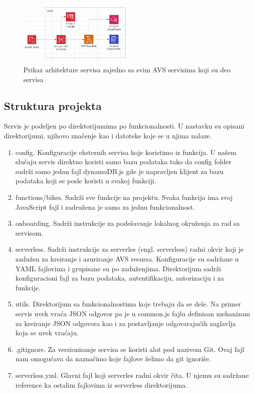 \documentclass[12pt,oneside]{memoir}
\begin{document}
\begin{figure}[!ht]
  \centering
  \includegraphics[width=0.5\textwidth]{AWS-Architecture-Overview.PNG}
  \caption{Prikaz arhitekture servisa zajedno sa svim AVS servisima koji su deo servisa}
  \label{fig:awsArchitecture}
\end{figure}


\subsection{Struktura projekta}
Servis je podeljen po direktorijumima po funkcionalnosti. U nastavku su opisani direktorijumi, njihovo značenje kao i datoteke koje se u njima nalaze.

\begin{enumerate}
  \item config. Konfiguracije eksternih servisa koje koristimo iz funkcija. U našem slučaju servis direktno koristi samo bazu podataka tako da config folder sadrži samo jedan fajl dynamoDB.js gde je napravljen klijent za bazu podataka koji se posle koristi u svakoj funkciji.
  \item functions/bikes. Sadrži sve funkcije na projektu. Svaka funkcija ima svoj JavaScript fajl i zadružena je samo za jednu funkcionalnost. 
  \item onboarding. Sadrži instrukcije za podešavanje lokalnog okruženja za rad sa servisom.
  \item serverless. Sadrži instrukcije za serverles (engl. serverless) radni okvir koji je zadužen za kreiranje i azuriranje AVS resursa. Konfiguracije su sadržane u YAML fajlovima i grupisane su po zaduženjima. Direktorijum sadrži konfiguracioni fajl za bazu podataka, autentifikaciju, autorizaciju i za funkcije.
  \item utils. Direktorijum sa funkcionalnostima koje trebaju da se dele. Na primer servis uvek vraća JSON odgovor pa je u common.js fajlu definisan mehanizam za kreiranje JSON odgovora kao i za postavljanje odgovarajućih zaglavlja koja se uvek vraćaju.
  \item .gitignore. Za verzionisanje servisa se koristi alat pod nazivom Git. Ovaj fajl nam omogućava da naznačimo koje fajlove želimo da git ignoriše.
  \item serverless.yml. Glavni fajl koji serverles radni okvir čita. U njemu su sadržane reference ka ostalim fajlovima iz serverless direktorijuma.
\end{enumerate}
\end{document}
